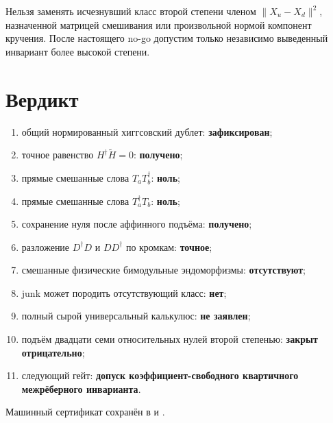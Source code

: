 \begin{nogocriterion}
Нельзя заменять исчезнувший класс второй степени членом
$\|X_u-X_d\|^2$, назначенной матрицей смешивания или произвольной нормой
компонент кручения. После настоящего no-go допустим только независимо
выведенный инвариант более высокой степени.
\end{nogocriterion}

\section{Вердикт}

\begin{protocol}
\begin{enumerate}
 \item общий нормированный хиггсовский дублет: \textbf{зафиксирован};
 \item точное равенство $H^\dagger\widetilde H=0$: \textbf{получено};
 \item прямые смешанные слова $T_aT_b^\dagger$: \textbf{ноль};
 \item прямые смешанные слова $T_a^\dagger T_b$: \textbf{ноль};
 \item сохранение нуля после аффинного подъёма: \textbf{получено};
 \item разложение $D^\dagger D$ и $DD^\dagger$ по кромкам:
 \textbf{точное};
 \item смешанные физические бимодульные эндоморфизмы:
 \textbf{отсутствуют};
 \item junk может породить отсутствующий класс: \textbf{нет};
 \item полный сырой универсальный калькулюс: \textbf{не заявлен};
 \item подъём двадцати семи относительных нулей второй степенью:
 \textbf{закрыт отрицательно};
 \item следующий гейт: \textbf{допуск коэффициент-свободного
 квартичного межрёберного инварианта}.
\end{enumerate}
\end{protocol}

Машинный сертификат сохранён в
 и
.